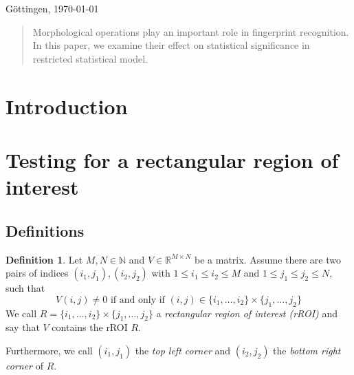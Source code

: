 \documentclass[a4paper,12pt]{article}
\theoremstyle{plain}
\theoremstyle{definition}
\newtheorem{definition}[theorem]{Definition}
\theoremstyle{remark}
\begin{document}
\begin{titlepage}

{\large Göttingen, \today}\\[2cm] %

\begin{abstract}
	Morphological operations play an important role in fingerprint recognition. In this paper, we examine their effect on statistical significance in restricted statistical model.
\end{abstract}
\end{titlepage}

\newpage

\tableofcontents

\newpage

\section{Introduction}

\newpage

\section{Testing for a rectangular region of interest}

\subsection{Definitions}

\begin{definition}
	Let $M, N \in \mathbb{N}$ and $V \in \mathbb{R}^{M \times N}$ be a matrix. Assume there are two pairs of indices $(i_1, j_1), (i_2, j_2)$ with $1 \leq i_1 \leq i_2 \leq M$ and $1 \leq j_1 \leq j_2 \leq N$, such that
	\begin{equation}
		V(i, j) \neq 0 \textrm{ if and only if } (i, j) \in \{ i_1, \dots, i_2 \} \times \{ j_1, \dots, j_2 \}
	\end{equation}
	We call $R = \{ i_1, \dots, i_2 \} \times \{ j_1, \dots, j_2 \}$ a \emph{rectangular region of interest (rROI)} and say that $V$ contains the rROI $R$.
	
	Furthermore, we call $(i_1, j_1)$ the \emph{top left corner} and $(i_2, j_2)$ the \emph{bottom right corner} of $R$.
\end{definition}
\end{document}
